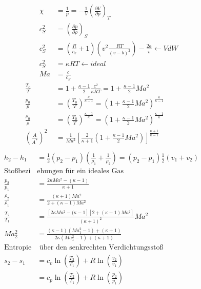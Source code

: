 \documentclass[twocolumn]{article}
\begin{document}
\begin{multicols}{2}
\setlength{\belowdisplayskip}{-10pt} \setlength{\belowdisplayshortskip}{-10pt}
\begin{align*}
	\qquad  \chi &= \frac{1}{p} = - \frac{1}{V}\left(\frac{\partial V}{\partial p}\right)_{T}  \\
	\qquad c_S^2 &= \left(\frac{\partial p}{\partial \rho}\right)_{S} \\
	\qquad c_S^2 &= \left(\frac{R}{c_v}+ 1\right)\left(v^2 \frac{RT}{(v-b)^2}\right) - \frac{2a}{v}\leftarrow VdW \\
	\qquad c_S^2 &= \kappa RT \leftarrow ideal\\
	\qquad Ma &= \frac{c}{c_S} \\
		\frac{T_0}{T} &= 1 + \frac{\kappa -1}{2} \frac{c^2}{\kappa RT} = 1 + \frac{\kappa -1}{2}Ma^2 \\
		\frac{p_0}{p} &= \left(\frac{T_0}{T}\right)^{\frac{\kappa}{\kappa-1}} = \left(1 + \frac{\kappa -1}{2}Ma^2\right)^{\frac{\kappa}{\kappa-1}} \\
		\frac{\rho_0}{\rho} &= \left(\frac{T_0}{T}\right)^{\frac{\kappa-1}{\kappa}} = \left(1 + \frac{\kappa -1}{2}Ma^2\right)^{\frac{\kappa -1 }{\kappa}} \\
		\left(\frac{A}{A^{*}}\right)^2 &= \frac{1}{Ma^2}\left[\frac{2}{\kappa + 1}\left( 1 + \frac{\kappa -1}{2} Ma^2 \right)\right]^{\frac{\kappa +1}{\kappa -1}} \\
\end{align*}
	\begin{align*}
		h_2 - h_1 &= \frac{1}{2}(p_2 - p_1) \left(\frac{1}{\rho_1} + \frac{1}{\rho_2}\right) = (p_2 -p_1) \frac{1}{2}(v_1 + v_2) \\
		\text{Stoßbezi}&\text{ehungen für ein ideales Gas} \\
		\frac{p_2}{p_1} &= \frac{2 \kappa Ma^2 - (\kappa -1)}{\kappa +1} \\
		\frac{\rho_2}{\rho_1} &= \frac{(\kappa +1 ) Ma^2}{2 + (\kappa -1) Ma^2} \\
		\frac{T_2}{T_1} &= \frac{\left[2\kappa Ma^2 - (\kappa -1 \right]\left[2 + (\kappa -1) Ma^2\right]}{(\kappa +1)^2}Ma^2 \\
		Ma_2^2 &= \frac{(\kappa -1)(Ma_1^2 -1) + (\kappa +1)}{2\kappa (Ma_1^2 -1 ) + (\kappa +1)} \\
		\text{Entropie}&\text{ über den senkrechten Verdichtungsstoß} \\
		s_2 -s_1 &= c_v \ln \left(\frac{T_2}{T_1}\right) + R \ln\left(\frac{v_2}{v_1}\right) \\
			 &= c_p \ln \left(\frac{T_2}{T_1}\right) + R \ln\left(\frac{p_2}{p_1}\right) \\
	\end{align*}


\end{multicols}
\end{document}
